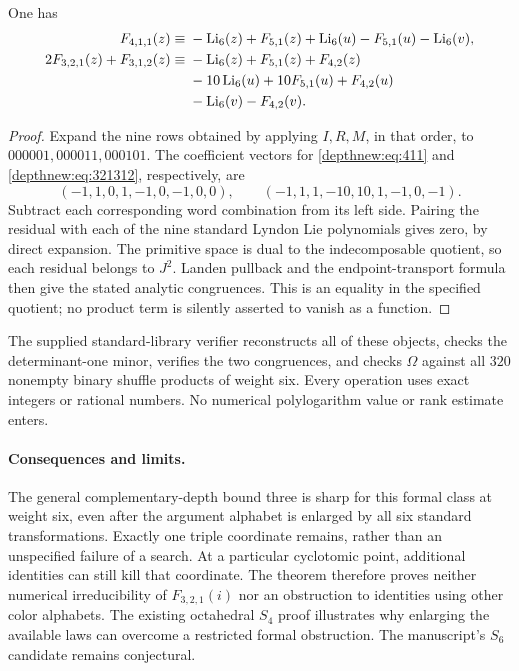 \begin{proposition}\label{depthnew:prop:congruences}
One has
\begin{align}
 F_{4,1,1}(z)\equiv{}&-\operatorname{Li}_6(z)+F_{5,1}(z)
 +\operatorname{Li}_6(u)-F_{5,1}(u)-\operatorname{Li}_6(v),
 \label{depthnew:eq:411}\\
 2F_{3,2,1}(z)+F_{3,1,2}(z)\equiv{}&
 -\operatorname{Li}_6(z)+F_{5,1}(z)+F_{4,2}(z)\notag\\
 &-10\operatorname{Li}_6(u)+10F_{5,1}(u)+F_{4,2}(u)\notag\\
 &-\operatorname{Li}_6(v)-F_{4,2}(v).
 \label{depthnew:eq:321312}
\end{align}
\end{proposition}
\begin{proof}
Expand the nine rows obtained by applying $I,R,M$, in that order,
to $000001,000011,000101$.
The coefficient vectors for \eqref{depthnew:eq:411} and
\eqref{depthnew:eq:321312}, respectively, are
\[
 (-1,1,0,1,-1,0,-1,0,0),\qquad
 (-1,1,1,-10,10,1,-1,0,-1).
\]
Subtract each corresponding word combination from its left side.
Pairing the residual with each of the nine standard Lyndon Lie
polynomials gives zero, by direct expansion. The primitive space is dual
to the indecomposable quotient, so each residual belongs to $J^2$.
Landen pullback and the endpoint-transport formula then give the stated
analytic congruences. This is an equality in the specified quotient;
no product term is silently asserted to vanish as a function.
\end{proof}

The supplied standard-library verifier reconstructs all of these objects,
checks the determinant-one minor, verifies the two congruences, and
checks $\Omega$ against all $320$ nonempty binary shuffle products of
weight six. Every operation uses exact integers or rational numbers.
No numerical polylogarithm value or rank estimate enters.

\paragraph{Consequences and limits.}
The general complementary-depth bound three is sharp for this formal
class at weight six, even after the argument alphabet is enlarged by
all six standard transformations. Exactly one triple coordinate remains,
rather than an unspecified failure of a search.
At a particular cyclotomic point, additional identities can still kill
that coordinate. The theorem therefore proves neither numerical
irreducibility of $F_{3,2,1}(i)$ nor an obstruction to identities using
other color alphabets. The existing octahedral $S_4$ proof illustrates
why enlarging the available laws can overcome a restricted formal
obstruction. The manuscript's $S_6$ candidate remains conjectural.
